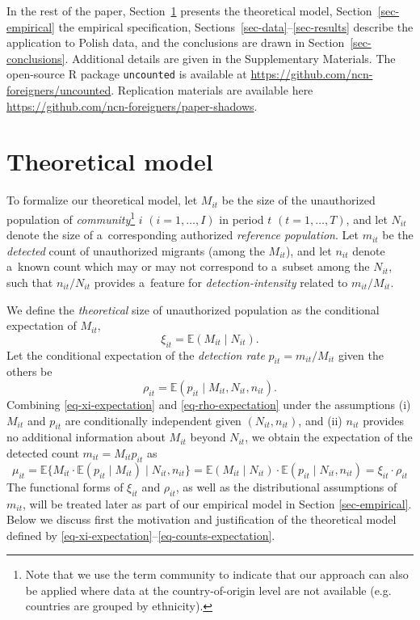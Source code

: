 In the rest of the paper, Section~\ref{sec-theory} presents the theoretical model, Section~\ref{sec-empirical} the empirical specification, 
Sections~\ref{sec-data}--\ref{sec-results} describe the application to Polish data, and the conclusions are drawn in Section~\ref{sec-conclusions}. Additional details are given in the Supplementary Materials. The open-source R \citep{r-cran} package \texttt{uncounted} is available at \url{https://github.com/ncn-foreigners/uncounted}. Replication materials are available here \url{https://github.com/ncn-foreigners/paper-shadows}.


\section{Theoretical model}\label{sec-theory}

To formalize our theoretical model, let $M_{it}$ be the size of the unauthorized population of \emph{community}\footnote{Note that we use the term community to indicate that our approach can also be applied where data at the country-of-origin level are not available (e.g. countries are grouped by ethnicity).} $i$ $(i=1,\ldots,I)$ in period $t$ $(t=1,\ldots,T)$, and let $N_{it}$ denote the size of a~corresponding authorized \emph{reference population}. Let $m_{it}$ be the \emph{detected} count of unauthorized migrants (among the $M_{it}$), and let $n_{it}$ denote a~known count which may or may not correspond to a~subset among the $N_{it}$, such that $n_{it}/N_{it}$ provides a~feature for \emph{detection-intensity} related to $m_{it}/M_{it}$.

We define the \emph{theoretical} size of unauthorized population as the conditional expectation of $M_{it}$‚
\begin{equation}
\xi_{it} = \mathbb{E}(M_{it} \mid N_{it}).
\label{eq-xi-expectation}
\end{equation} 
Let the conditional expectation of the \emph{detection rate} $p_{it} = m_{it}/M_{it}$ given the others be 
\begin{equation}
\rho_{it} = \mathbb{E}(p_{it} \mid M_{it}, N_{it}, n_{it}).
\label{eq-rho-expectation}
\end{equation}
Combining \eqref{eq-xi-expectation} and \eqref{eq-rho-expectation} under the assumptions (i) $M_{it}$ and $p_{it}$ are conditionally independent given $(N_{it}, n_{it})$, and (ii) $n_{it}$ provides no additional information about $M_{it}$ beyond $N_{it}$, we obtain the expectation of the detected count $m_{it} = M_{it} p_{it}$ as 
\begin{equation}
\mu_{it} = \mathbb{E}\{ M_{it}\cdot \mathbb{E}(p_{it} \mid M_{it}) \mid N_{it}, n_{it}\} 
= \mathbb{E}(M_{it} \mid N_{it}) \cdot \mathbb{E}(p_{it} \mid N_{it},n_{it}) = \xi_{it} \cdot \rho_{it}
\label{eq-counts-expectation}
\end{equation}
The functional forms of $\xi_{it}$ and $\rho_{it}$, as well as the distributional assumptions of $m_{it}$, will be treated later as part of our empirical model in Section \ref{sec-empirical}. Below we discuss first the motivation and justification of the theoretical model defined by \eqref{eq-xi-expectation}--\eqref{eq-counts-expectation}.

